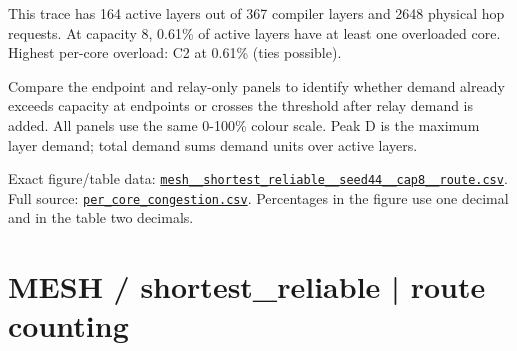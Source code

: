 \documentclass[10pt,a4paper]{article}
\begin{document}
This trace has 164 active layers out of 367 compiler layers and 2648 physical hop requests. At capacity 8, 0.61\% of active layers have at least one overloaded core. Highest per-core overload: C2 at 0.61\% (ties possible).\par
Compare the endpoint and relay-only panels to identify whether demand already exceeds capacity at endpoints or crosses the threshold after relay demand is added. All panels use the same 0-100\% colour scale. Peak D is the maximum layer demand; total demand sums demand units over active layers.\par
Exact figure/table data: \href{\detokenize{file:///home/dhruv-pansuriya/Documents/BTP/Compiler-Driven-ACE/output/pdf/qaoa_methods_congestion/tables/mesh__shortest_reliable__seed44__cap8__route.csv}}{\nolinkurl{mesh__shortest_reliable__seed44__cap8__route.csv}}. Full source: \href{\detokenize{file:///home/dhruv-pansuriya/Documents/BTP/Compiler-Driven-ACE/results/qaoa_2seed_2026-10-26/congestion/per_core_congestion.csv}}{\nolinkurl{per_core_congestion.csv}}. Percentages in the figure use one decimal and in the table two decimals.\par
\clearpage
\section*{MESH / shortest\_reliable | route counting}
\end{document}
